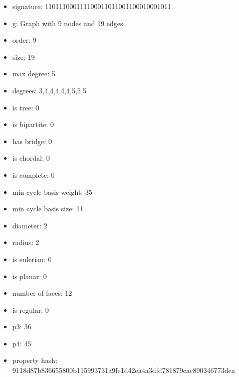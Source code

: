 \newpage
\begin{figure}
\end{figure}
\begin{itemize}
\item signature: 110111000111100011011001100010001011
\item g: Graph with 9 nodes and 19 edges
\item order: 9
\item size: 19
\item max degree: 5
\item degrees: 3,4,4,4,4,4,5,5,5
\item is tree: 0
\item is bipartite: 0
\item has bridge: 0
\item is chordal: 0
\item is complete: 0
\item min cycle basis weight: 35
\item min cycle basis size: 11
\item diameter: 2
\item radius: 2
\item is eulerian: 0
\item is planar: 0
\item number of faces: 12
\item is regular: 0
\item p3: 36
\item p4: 45
\item property hash: 9118d87b836655800b115993731a9fe1d42ea4a3dfd781879cac890346773dea
\end{itemize}
